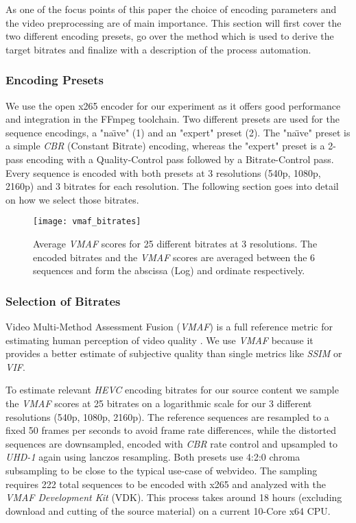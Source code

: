 As one of the focus points of this paper the choice of encoding parameters and the video preprocessing are of main importance. This section will first cover the two different encoding presets, go over the method which is used to derive the target bitrates and finalize with a description of the process automation.

\subsubsection{Encoding Presets}
We use the open x265 encoder for our experiment as it offers good performance and integration in the FFmpeg toolchain. Two different presets are used for the sequence encodings, a "na\"{\i}ve" (1) and an "expert" preset (2). The "na\"{\i}ve" preset is a simple \textit{CBR} (Constant Bitrate) encoding, whereas the "expert" preset is a 2-pass encoding with a Quality-Control pass followed by a Bitrate-Control pass.  Every sequence is encoded with both presets at 3 resolutions (540p, 1080p, 2160p) and 3 bitrates for each resolution. The following section goes into detail on how we select those bitrates.

\begin{figure}[htb!]
	\centering
	\texttt{[image: vmaf\_bitrates]}
	\caption{Average \textit{VMAF} scores for 25 different bitrates at 3 resolutions. The encoded bitrates and the \textit{VMAF} scores are averaged between the 6 sequences and form the abscissa (Log) and ordinate respectively.}
	\label{fig:vmaf:bitrates}
\end{figure}

\subsubsection{Selection of Bitrates}
Video Multi-Method Assessment Fusion (\textit{VMAF}) is a full reference metric for estimating human perception of video quality \cite{lin2013:mmf}. We use \textit{VMAF} because it provides a better estimate of subjective quality than single metrics like \textit{SSIM} or \textit{VIF}.

To estimate relevant \textit{HEVC} encoding bitrates for our source content we sample the \textit{VMAF} scores at 25 bitrates on a logarithmic scale for our 3 different resolutions (540p, 1080p, 2160p). The reference sequences are resampled to a fixed 50 frames per seconds to avoid frame rate differences, while the distorted sequences are downsampled, encoded with \textit{CBR} rate control and upsampled to \textit{UHD-1} again using lanczos resampling. Both presets use 4:2:0 chroma subsampling to be close to the typical use-case of webvideo. The sampling requires 222 total sequences to be encoded with x265 and analyzed with the \textit{VMAF Development Kit} (VDK). This process takes around 18 hours (excluding download and cutting of the source material) on a current 10-Core x64 CPU.

